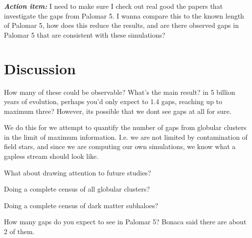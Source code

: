 \documentclass{aa}
\begin{document}
      
      

    \textbf{\textit{Action item:}} I need to make sure I check out real good the papers that investigate the gaps from Palomar 5. I wanna compare this to the known length of Palomar 5, how does this reduce the results, and are there observed gaps in Palomar 5 that are consistent with these simulations? 



\section{Discussion}
    How many of these could be observable? What's the main result? in 5 billion years of evolution, perhaps you'd only expect to 1.4 gaps, reaching up to maximum three? However, its possible that we dont see gaps at all for sure. 

    We do this for we attempt to quantify the number of gaps from globular clusters in the limit of maximum information. I.e. we are not limited by contamination of field stars, and since we are computing our own simulations, we know what a gapless stream should look like. 


    What about drawing attention to future studies? 

    Doing a complete census of all globular clusters? 

    Doing a complete census of dark matter subhaloes? 

    How many gaps do you expect to see in Palomar 5? Bonaca said there are about 2 of them. 





\end{document}
